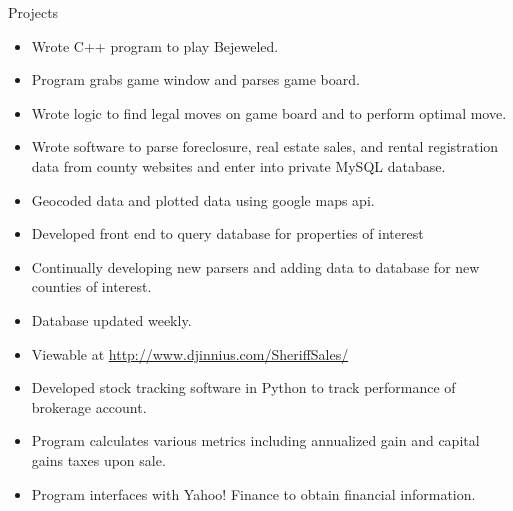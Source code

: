 \begin{category}{Projects}





\begin{itemize}
\item Wrote C++ program to play Bejeweled.
\item Program grabs game window and parses game board.
\item Wrote logic to find legal moves on game board and to perform optimal move.
\end{itemize}

\begin{itemize}
\item Wrote software to parse foreclosure, real estate sales, and rental registration data from county websites and enter into private MySQL database.
\item Geocoded data and plotted data using google maps api.
\item Developed front end to query database for properties of interest
\item Continually developing new parsers and adding data to database for new counties of interest.
\item Database updated weekly.
\item Viewable at \href{ http://www.djinnius.com/SheriffSales/ }{ http://www.djinnius.com/SheriffSales/}
\end{itemize}

\begin{itemize}
\item Developed stock tracking software in Python to track performance of brokerage account.
\item Program calculates various metrics including annualized gain and capital gains taxes upon sale.
\item Program interfaces with Yahoo! Finance to obtain financial information.
\end{itemize}


\end{category}
